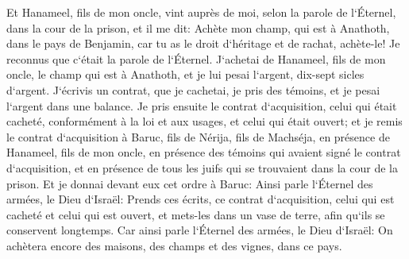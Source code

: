 \verse Et Hanameel, fils de mon oncle, vint auprès de moi, selon la parole de l`Éternel, dans la cour de la prison, et il me dit: Achète mon champ, qui est à Anathoth, dans le pays de Benjamin, car tu as le droit d`héritage et de rachat, achète-le! Je reconnus que c`était la parole de l`Éternel. 
\verse J`achetai de Hanameel, fils de mon oncle, le champ qui est à Anathoth, et je lui pesai l`argent, dix-sept sicles d`argent. 
\verse J`écrivis un contrat, que je cachetai, je pris des témoins, et je pesai l`argent dans une balance. 
\verse Je pris ensuite le contrat d`acquisition, celui qui était cacheté, conformément à la loi et aux usages, et celui qui était ouvert; 
\verse et je remis le contrat d`acquisition à Baruc, fils de Nérija, fils de Machséja, en présence de Hanameel, fils de mon oncle, en présence des témoins qui avaient signé le contrat d`acquisition, et en présence de tous les juifs qui se trouvaient dans la cour de la prison. 
\verse Et je donnai devant eux cet ordre à Baruc: 
\verse Ainsi parle l`Éternel des armées, le Dieu d`Israël: Prends ces écrits, ce contrat d`acquisition, celui qui est cacheté et celui qui est ouvert, et mets-les dans un vase de terre, afin qu`ils se conservent longtemps. 
\verse Car ainsi parle l`Éternel des armées, le Dieu d`Israël: On achètera encore des maisons, des champs et des vignes, dans ce pays. 
